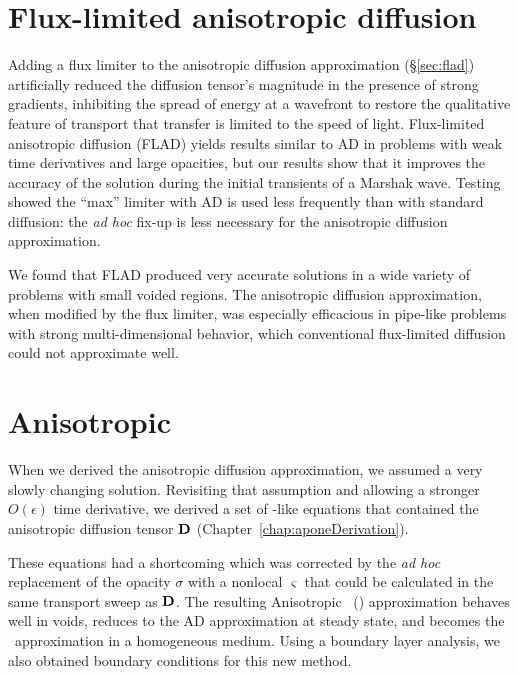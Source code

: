 \section{Flux-limited anisotropic diffusion}

Adding a flux limiter to the anisotropic diffusion approximation
(\S\ref{sec:flad}) artificially reduced the diffusion tensor's magnitude in
the presence of strong gradients, inhibiting the spread of energy at a wavefront
to restore the qualitative feature of transport that transfer is limited to the
speed of light. Flux-limited anisotropic diffusion (FLAD) yields results
similar to AD in problems with weak time derivatives and large opacities, but
our results show that it improves the accuracy of the solution during the
initial transients of a Marshak wave.
Testing showed the ``max'' limiter with AD is used less frequently than with
standard diffusion: the \emph{ad hoc}
fix-up is less necessary for the anisotropic diffusion approximation.

We found that FLAD produced very accurate solutions in a wide
variety of problems with small voided regions. The anisotropic diffusion
approximation, when modified by the flux limiter, was especially efficacious in
pipe-like problems with strong multi-dimensional behavior, which conventional
flux-limited diffusion could not approximate well.

\section{Anisotropic \texorpdfstring{\Pone}{P1}}

When we derived the anisotropic diffusion approximation, we assumed a very
slowly changing solution. Revisiting that assumption and allowing a stronger
$O(\epsilon)$ time derivative, we
derived a set of \Pone-like equations that contained the anisotropic diffusion
tensor $\mathbf{D}$ (Chapter~\ref{chap:aponeDerivation}). 

These equations
had a shortcoming which was corrected by the \emph{ad hoc} replacement of the
opacity $\sigma$ with a nonlocal $\varsigma$ that could be
calculated in the same transport sweep as $\mathbf{D}$. The resulting Anisotropic
\Pone\ (\APone) approximation behaves well in voids, reduces to the AD
approximation at steady state, and becomes the \Pone\ approximation in a
homogeneous medium.
Using a boundary layer analysis, we also obtained boundary conditions for this
new method.

